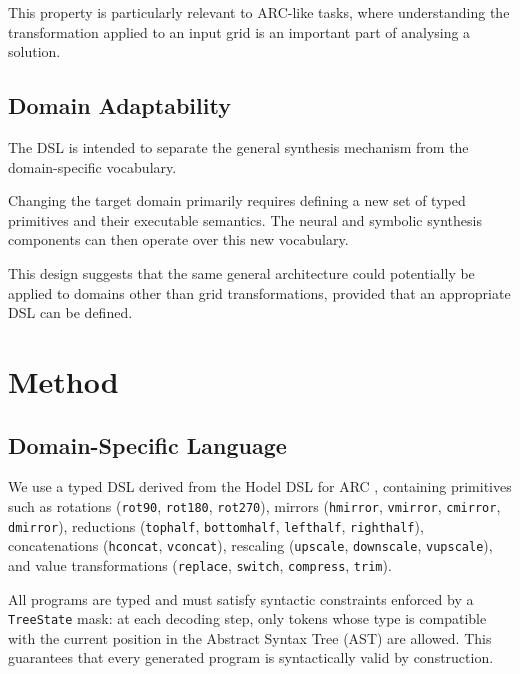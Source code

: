 \documentclass[final]{nesy2027}
\begin{document}
This property is particularly relevant to ARC-like tasks, where understanding
the transformation applied to an input grid is an important part of analysing
a solution.

\subsection{Domain Adaptability}
\label{subsec:dsl-adaptability}

The DSL is intended to separate the general synthesis mechanism from the
domain-specific vocabulary.

Changing the target domain primarily requires defining a new set of typed
primitives and their executable semantics. The neural and symbolic synthesis
components can then operate over this new vocabulary.

This design suggests that the same general architecture could potentially be
applied to domains other than grid transformations, provided that an
appropriate DSL can be defined.

\section{Method}
\label{sec:method}

\subsection{Domain-Specific Language}
\label{sec:method-dsl}

We use a typed DSL derived from the Hodel DSL for ARC
\citep{hodel2024arc}, containing primitives such as rotations
(\texttt{rot90}, \texttt{rot180}, \texttt{rot270}), mirrors
(\texttt{hmirror}, \texttt{vmirror}, \texttt{cmirror}, \texttt{dmirror}),
reductions (\texttt{tophalf}, \texttt{bottomhalf}, \texttt{lefthalf},
\texttt{righthalf}), concatenations (\texttt{hconcat}, \texttt{vconcat}),
rescaling (\texttt{upscale}, \texttt{downscale}, \texttt{vupscale}), and value
transformations (\texttt{replace}, \texttt{switch}, \texttt{compress},
\texttt{trim}).

All programs are typed and must satisfy syntactic constraints enforced by a
\texttt{TreeState} mask: at each decoding step, only tokens whose type is
compatible with the current position in the Abstract Syntax Tree (AST) are
allowed. This guarantees that every generated program is syntactically valid by
construction.
\end{document}
